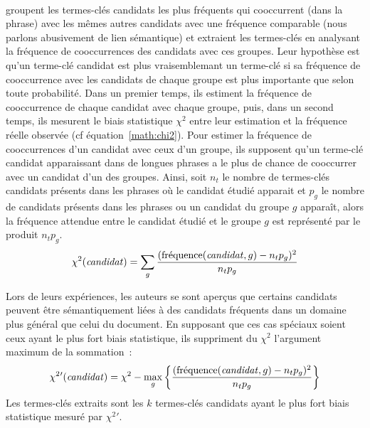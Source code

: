         ~\\ groupent les termes-clés
        candidats les plus fréquents qui cooccurrent (dans la phrase) avec les
        mêmes autres candidats avec une fréquence comparable (nous parlons
        abusivement de lien sémantique) et extraient les termes-clés en
        analysant la fréquence de cooccurrences des candidats avec ces groupes.
        Leur hypothèse est qu'un terme-clé candidat est plus vraisemblemant un
        terme-clé si sa fréquence de cooccurrence avec les candidats de chaque
        groupe est plus importante que selon toute probabilité. Dans un premier
        temps, ils estiment la fréquence de cooccurrence de chaque candidat avec
        chaque groupe, puis, dans un second temps, ils mesurent le biais
        statistique $\chi^2$ entre leur estimation et la fréquence réelle
        observée (cf équation~\ref{math:chi2}). Pour estimer la fréquence de
        cooccurrences d'un candidat avec ceux d'un groupe, ils supposent qu'un
        terme-clé candidat apparaissant dans de longues phrases a le plus de
        chance de cooccurrer avec un candidat d'un des groupes. Ainsi, soit
        $n_t$ le nombre de termes-clés candidats présents dans les phrases où le
        candidat étudié apparait et $p_g$ le nombre de candidats présents dans
        les phrases ou un candidat du groupe $g$ apparaît, alors la fréquence
        attendue entre le candidat étudié et le groupe $g$ est représenté par le
        produit $n_tp_g$.
        \begin{align}
          \chi^2(\text{\textit{candidat}}) = \sum_{g} \frac{(\text{fréquence}(\text{\textit{candidat}}, g) - n_tp_g)^2}{n_tp_g} \label{math:chi2}
        \end{align}
        
        Lors de leurs expériences, les auteurs se sont aperçus que certains
        candidats peuvent être sémantiquement liées à des candidats fréquents
        dans un domaine plus général que celui du document. En supposant que ces
        cas spéciaux soient ceux ayant le plus fort biais statistique, ils
        suppriment du $\chi^2$ l'argument maximum de la sommation~:
        \begin{align}
          \chi^2{'}(\text{\textit{candidat}}) = \chi^2 - \max_{g}\left\{\frac{(\text{fréquence}(\text{\textit{candidat}}, g) - n_tp_g)^2}{n_tp_g}\right\}
        \end{align}
        Les termes-clés extraits sont les $k$ termes-clés candidats ayant le
        plus fort biais statistique mesuré par $\chi^2{'}$.


